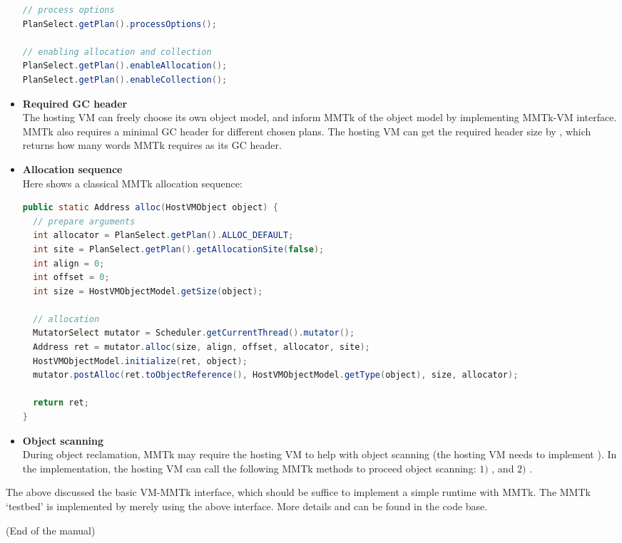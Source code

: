 \documentclass[12pt]{article}
\begin{document}
\begin{itemize}
\begin{lstlisting}[language=java]
// process options
PlanSelect.getPlan().processOptions();

// enabling allocation and collection
PlanSelect.getPlan().enableAllocation();
PlanSelect.getPlan().enableCollection();
\end{lstlisting}

\item
\textbf{Required GC header\\}
The hosting VM can freely choose its own object model,
and inform MMTk of the object model by implementing 
MMTk-VM interface. MMTk also requires a minimal GC
header for different chosen plans. The hosting
VM can get the required header size by 
,
which returns how many words MMTk requires as its
GC header. 

\item
\textbf{Allocation sequence\\}
Here shows a classical MMTk allocation sequence:
\begin{lstlisting}[language=java]
public static Address alloc(HostVMObject object) {
  // prepare arguments
  int allocator = PlanSelect.getPlan().ALLOC_DEFAULT; 
  int site = PlanSelect.getPlan().getAllocationSite(false); 
  int align = 0;
  int offset = 0;
  int size = HostVMObjectModel.getSize(object);

  // allocation
  MutatorSelect mutator = Scheduler.getCurrentThread().mutator(); 
  Address ret = mutator.alloc(size, align, offset, allocator, site);
  HostVMObjectModel.initialize(ret, object);
  mutator.postAlloc(ret.toObjectReference(), HostVMObjectModel.getType(object), size, allocator);
  
  return ret;
}
\end{lstlisting}

\item
\textbf{Object scanning\\}
During object reclamation, MMTk may require
the hosting VM to help with object scanning 
(the hosting VM needs to implement 
). 
In the implementation, the hosting VM can call the following
MMTk methods to proceed object scanning:
$1)$ , and 
$2)$ . 

\end{itemize}

The above discussed the basic VM-MMTk interface, which
should be suffice to implement a simple runtime with MMTk. 
The MMTk `testbed' is implemented by merely using the above
interface. More details and can be found in the code base. 

\vspace{2em}
\noindent
(End of the manual)
\clearpage
\end{document}
